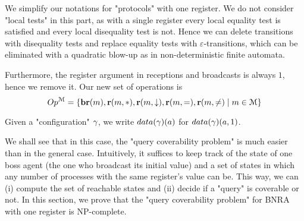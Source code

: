 
	We simplify our notations for "protocols" with one register.
	We do not consider "local tests" in this part, as with a single register every local equality test is satisfied and every local disequality test is not.
	Hence we can delete transitions with disequality tests and replace equality tests with $\varepsilon$-transitions, which can be eliminated with a quadratic blow-up as in non-deterministic finite automata.
	
	Furthermore, the register argument in receptions and broadcasts is always $1$, hence we remove it.
	Our new set of operations is 
	\[
	Op^{\mathcal{M}} = \{\textbf{br}(m), \textbf{r}(m, {*}), \textbf{r}(m, \downarrow), \textbf{r}(m, {=}), \textbf{r}(m, {\ne}) \mid m \in \mathcal{M}\}
	\]
	
	Given a "configuration" $\gamma$, we write $\data{\config}(a)$ for $\data{\config}(a,1)$. 

	We shall see that in this case, the "query coverability problem" is much easier than in the general case. Intuitively, it suffices to keep track of the state of one boss agent (the one who broadcast its initial value) and a set of states in which any number of processes with the same register's value can be. This way, we can (i) compute the set of reachable states and (ii) decide if a "query" is coverable or not. In this section, we prove that the "query coverability problem" for BNRA with one register is NP-complete.




